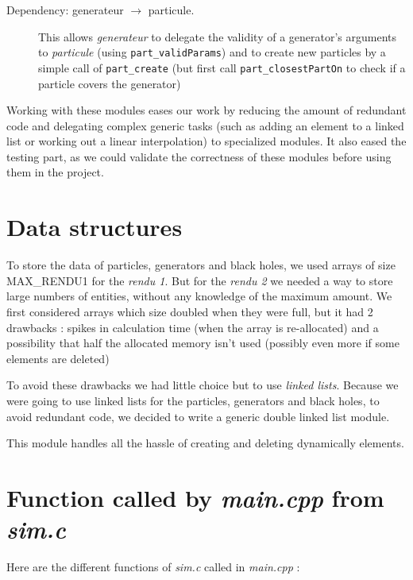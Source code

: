 \documentclass[a4paper]{article} %
\begin{document}
\begin{multicols*}{2}
\begin{description}
\item[Dependency: generateur $\rightarrow$ particule.]
This allows \emph{generateur} to delegate the validity of a generator's arguments to \emph{particule}
(using \texttt{part\_validParams}) 
and to create new particles by a simple call of \texttt{part\_create}
(but first call \texttt{part\_closestPartOn} to check if a particle covers the generator)
\end{description}

Working with these modules eases our work by reducing the amount of redundant code and delegating complex generic tasks
(such as adding an element to a linked list or working out a linear interpolation) to specialized modules.
It also eased the testing part, as we could validate the correctness of these modules before using them in the project.

\section{Data structures}

To store the data of particles, generators and black holes,
we used arrays of size MAX\_RENDU1 for the \emph{rendu 1}.
But for the \emph{rendu 2} we needed a way to store large numbers of entities,
without any knowledge of the maximum amount.
We first considered arrays which size doubled when they were full, but it had 2 drawbacks :
spikes in calculation time (when the array is re-allocated)
and a possibility that half the allocated memory isn't used (possibly even more if some elements are deleted)

To avoid these drawbacks we had little choice but to use \emph{linked lists}.
Because we were going to use linked lists for the particles, generators and black holes, to avoid redundant code,
we decided to write a generic double linked list module.

This module handles all the hassle of creating and deleting dynamically elements.



\section{Function called by \emph{main.cpp} from \emph{sim.c}}
Here are the different functions of \emph{sim.c} called in \emph{main.cpp} :


\end{multicols*}
\end{document}
